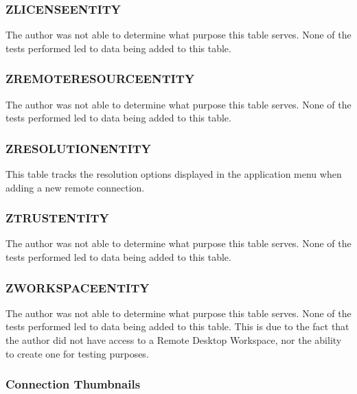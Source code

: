\documentclass[journal]{IEEEtran}
\begin{document}
\subsubsection{ZLICENSEENTITY}

The author was not able to determine what purpose this table serves. None of the tests performed led to data being added to this table.\\

\subsubsection{ZREMOTERESOURCEENTITY}

The author was not able to determine what purpose this table serves. None of the tests performed led to data being added to this table.\\

\subsubsection{ZRESOLUTIONENTITY}

This table tracks the resolution options displayed in the application menu when adding a new remote connection.\\

\subsubsection{ZTRUSTENTITY}

The author was not able to determine what purpose this table serves. None of the tests performed led to data being added to this table.\\

\subsubsection{ZWORKSPACEENTITY}

The author was not able to determine what purpose this table serves. None of the tests performed led to data being added to this table. This is due to the fact that the author did not have access to a Remote Desktop Workspace, nor the ability to create one for testing purposes.\\

\subsubsection{Connection Thumbnails}
\end{document}
